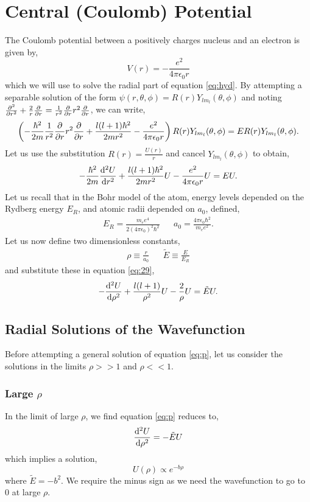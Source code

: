 \documentclass{book}
\begin{document}
\section{Central (Coulomb) Potential}
The Coulomb potential between a positively charges nucleus and an electron is given by,
\begin{equation}
	V(r) = -\frac{e^2}{4\pi\epsilon_0r}
\end{equation}
which we will use to solve the radial part of equation \eqref{eq:hyd}. By attempting a separable solution of the form $\psi(r, \theta,\phi) = R(r)Y_{lm_l}(\theta,\phi)$ and noting $\pdv[2]{r} + \frac{2}{r}\pdv{r} = \frac{1}{r^2}\pdv{r}r^2\pdv{r}$, we can write,
\begin{equation}
	\left(-\frac{\hbar^2}{2m}\frac{1}{r^2}\pdv{r}r^2\pdv{r} + \frac{l(l+1)\hbar^2}{2mr^2} -\frac{e^2}{4\pi\epsilon_0r}\right)R(r)Y_{lm_l}(\theta,\phi) = ER(r)Y_{lm_l}(\theta,\phi).
\end{equation}
Let us use the substitution $R(r) = \frac{U(r)}{r}$ and cancel $Y_{lm_l}(\theta,\phi)$ to obtain,
\begin{equation}
	-\frac{\hbar^2}{2m}\dv[2]{U}{r} + \frac{l(l+1)\hbar^2}{2mr^2}U - \frac{e^2}{4\pi\epsilon_0r}U = EU. \label{eq:29}
\end{equation}
Let us recall that in the Bohr model of the atom, energy levels depended on the Rydberg energy $E_R$, and atomic radii depended on $a_0$, defined,
\begin{align}
	E_R = \frac{m_ee^4}{2(4\pi\epsilon_0)^2\hbar^2} && a_0 = \frac{4\pi\epsilon_0\hbar^2}{m_ee^2}.
\end{align}
Let us now define two dimensionless constants,
\begin{align}
	\rho \equiv \frac{r}{a_0} && \tilde{E} \equiv \frac{E}{E_R}
\end{align}
and substitute these in equation \eqref{eq:29},
\begin{equation}
	-\dv[2]{U}{\rho} + \frac{l(l+1)}{\rho^2}U - \frac{2}{\rho}U = \tilde{E}U. \label{eq:p}
\end{equation}
\subsection{Radial Solutions of the Wavefunction}
Before attempting a general solution of equation \eqref{eq:p}, let us consider the solutions in the limits $\rho >>1$ and $\rho << 1$. 
\subsubsection{Large $\rho$}
In the limit of large $\rho$, we find equation \eqref{eq:p} reduces to,
\begin{equation}
	\dv[2]{U}{\rho} = - \tilde{E}U
\end{equation}
which implies a solution,
\begin{equation}
	U(\rho) \propto e^{-b\rho}
\end{equation}
where $\tilde{E} = -b^2$. We require the minus sign as we need the wavefunction to go to 0 at large $\rho$.
\end{document}
